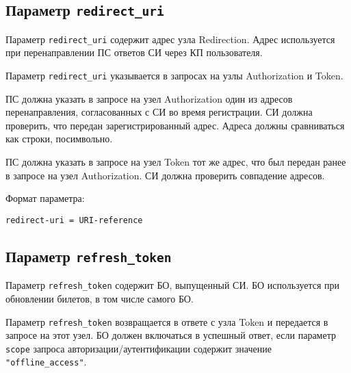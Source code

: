 \subsection{Параметр \lstinline{redirect_uri}}\label{PARAMS.RedirectUri}

Параметр \lstinline{redirect_uri} содержит адрес узла Redirection.
Адрес используется при перенаправлении ПС ответов СИ через КП пользователя.

Параметр \lstinline{redirect_uri} указывается в запросах на узлы Authorization 
и Token.

ПС должна указать в запросе на узел Authorization один из адресов перенаправления, 
согласованных с СИ во время регистрации. СИ должна проверить, что передан 
зарегистрированный адрес. Адреса должны сравниваться как строки, посимвольно.

ПС должна указать в запросе на узел Token тот же адрес, что был передан ранее 
в запросе на узел Authorization. СИ должна проверить совпадение адресов.

Формат параметра:
\begin{lstlisting}
redirect-uri = URI-reference
\end{lstlisting}



\subsection{Параметр \lstinline{refresh_token}}\label{PARAMS.RefreshToken} 

Параметр \lstinline{refresh_token} содержит БО, выпущенный СИ.
БО используется при обновлении билетов, в том числе самого БО.

Параметр \lstinline{refresh_token} возвращается в ответе с узла Token и 
передается в запросе на этот узел.
%
БО должен включаться в успешный ответ, если параметр \lstinline{scope} 
запроса авторизации/аутентификации содержит значение 
\lstinline{"offline_access"}. 

